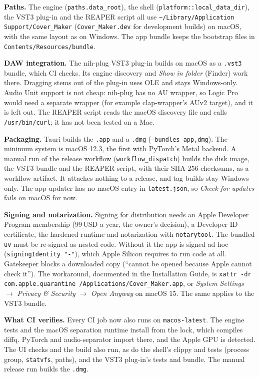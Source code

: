 \textbf{Paths.} The engine (\texttt{paths.data\_root}), the shell
(\texttt{platform::local\_data\_dir}), the VST3 plug-in and the REAPER script
all use \texttt{\textasciitilde/Library/Application Support/Cover\_Maker}
(\texttt{Cover\_Maker.dev} for development builds) on macOS, with the same
layout as on Windows. The app bundle keeps the bootstrap files in
\texttt{Contents/Resources/bundle}.

\textbf{DAW integration.} The nih-plug VST3 plug-in builds on macOS as a
\texttt{.vst3} bundle, which CI checks. Its engine discovery and \emph{Show in
folder} (Finder) work there. Dragging stems out of the plug-in uses OLE and
stays Windows-only. Audio Unit support is not cheap: nih-plug has no AU
wrapper, so Logic Pro would need a separate wrapper (for example
clap-wrapper's AUv2 target), and it is left out. The REAPER script reads the
macOS discovery file and calls \texttt{/usr/bin/curl}; it has not been tested
on a Mac.

\textbf{Packaging.} Tauri builds the \texttt{.app} and a \texttt{.dmg}
(\texttt{--bundles app,dmg}). The minimum system is macOS 12.3, the first
with PyTorch's Metal backend. A manual run of the release workflow
(\texttt{workflow\_dispatch}) builds the disk image, the VST3 bundle and the
REAPER script, with their SHA-256 checksums, as a workflow artifact. It
attaches nothing to a release, and tag builds stay Windows-only. The app
updater has no macOS entry in \texttt{latest.json}, so \emph{Check for
updates} fails on macOS for now.

\textbf{Signing and notarization.} Signing for distribution needs an Apple
Developer Program membership (99\,USD a year, the owner's decision), a
Developer ID certificate, the hardened runtime and notarization with
\texttt{notarytool}. The bundled \texttt{uv} must be re-signed as nested
code. Without it the app is signed ad hoc (\texttt{signingIdentity "-"}),
which Apple Silicon requires to run code at all. Gatekeeper blocks a
downloaded copy (``cannot be opened because Apple cannot check it'').
The workaround, documented in the Installation Guide, is
\texttt{xattr -dr com.apple.quarantine /Applications/Cover\_Maker.app}, or
\emph{System Settings} $\rightarrow$ \emph{Privacy \& Security} $\rightarrow$
\emph{Open Anyway} on macOS 15. The same applies to the VST3 bundle.

\textbf{What CI verifies.} Every CI job now also runs on
\texttt{macos-latest}. The engine tests and the macOS separation runtime install
from the lock, which compiles diffq. PyTorch and audio-separator import there,
and the Apple GPU is detected. The UI checks and the build also run, as do the
shell's clippy and tests (process group, \texttt{statvfs}, paths), and the
VST3 plug-in's tests and bundle. The manual release run builds the
\texttt{.dmg}.

